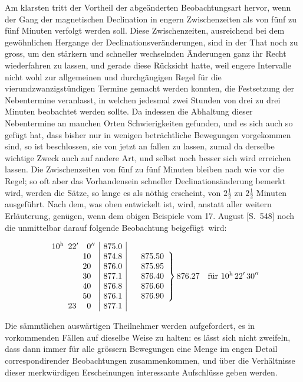 Am klarsten tritt der Vortheil der abgeänderten Beobachtungsart hervor, wenn der Gang der magnetischen Declination in engern Zwischenzeiten als von fünf zu fünf Minuten verfolgt werden soll. Diese Zwischenzeiten, ausreichend bei dem gewöhnlichen Hergange der Declinationsveränderungen, sind in der That noch zu gross, um den stärkern und schneller wechselnden Änderungen ganz ihr Recht wiederfahren zu lassen, und gerade diese Rücksicht hatte, weil engere Intervalle nicht wohl zur allgemeinen und durchgängigen Regel für die vierundzwanzigstündigen Termine gemacht werden konnten, die Festsetzung der Nebentermine veranlasst, in welchen jedesmal zwei Stunden von drei zu drei Minuten beobachtet werden sollte. Da indessen die Abhaltung dieser Nebentermine an manchen Orten Schwierigkeiten gefunden, und es sich auch so gefügt hat, dass bisher nur in wenigen beträchtliche Bewegungen vorgekommen sind, so ist beschlossen, sie von jetzt an fallen zu lassen, zumal da derselbe wichtige Zweck auch auf andere Art, und selbst noch besser sich wird erreichen lassen. Die Zwischenzeiten von fünf zu fünf Minuten bleiben nach wie vor die Regel; so oft aber das Vorhandensein schneller Declinationsänderung bemerkt wird, werden die Sätze, so lange es als nöthig erscheint, von $2\frac12$ zu $2\frac12$ Minuten ausgeführt. Nach dem, was oben entwickelt ist, wird, anstatt aller weitern Erläuterung, genügen, wenn dem obigen Beispiele vom 17. August [S.\ 548] noch die unmittelbar darauf folgende Beobachtung beigefügt~wird:
\par\clearpage
{}
\[
\begin{array}{r@{}l@{\enspace}r@{}l@{\enspace}r@{}l|r|}
10&{}^{\mathrm h}&22&{}'&0&{}''&875.0\\
&&&&10&&874.8\\
&&&&20&&876.0\\
&&&&30&&877.1\\
&&&&40&&876.8\\
&&&&50&&876.1\\
&&23&&0&&877.1
\end{array}\quad
\left.\begin{array}{r}875.50\\875.95\\876.40\\876.60\\876.90\end{array}\right\}876.27\quad\text{für }10^{\mathrm h}\,22'\,30''
\]

Die sämmtlichen auswärtigen Theilnehmer werden aufgefordert, es in vorkommenden Fällen auf dieselbe Weise zu halten: es lässt sich nicht zweifeln, dass dann immer für alle grössern Bewegungen eine Menge im engen Detail correspondirender Beobachtungen zusammenkommen, und über die Verhältnisse dieser merkwürdigen Erscheinungen interessante Aufschlüsse geben werden.

